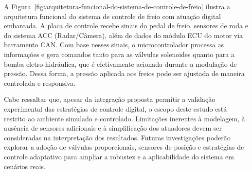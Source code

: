 A Figura~\ref{fig:arquitetura-funcional-do-sistema-de-controle-de-freio} ilustra a arquitetura funcional do sistema de controle de freio com atuação digital embarcada. A placa de controle recebe sinais do pedal de freio, sensores de roda e do sistema ACC (Radar/Câmera), além de dados do módulo ECU do motor via barramento CAN. Com base nesses sinais, o microcontrolador processa as informações e gera comandos tanto para as válvulas solenoides quanto para a bomba eletro-hidráulica, que é efetivamente acionada durante a modulação de pressão. Dessa forma, a pressão aplicada aos freios pode ser ajustada de maneira controlada e responsiva.

Cabe ressaltar que, apesar da integração proposta permitir a validação experimental das estratégias de controle digital, o escopo deste estudo está restrito ao ambiente simulado e controlado. Limitações inerentes à modelagem, à ausência de sensores adicionais e à simplificação dos atuadores devem ser consideradas na interpretação dos resultados. Futuras investigações poderão explorar a adoção de válvulas proporcionais, sensores de posição e estratégias de controle adaptativo para ampliar a robustez e a aplicabilidade do sistema em cenários reais.


